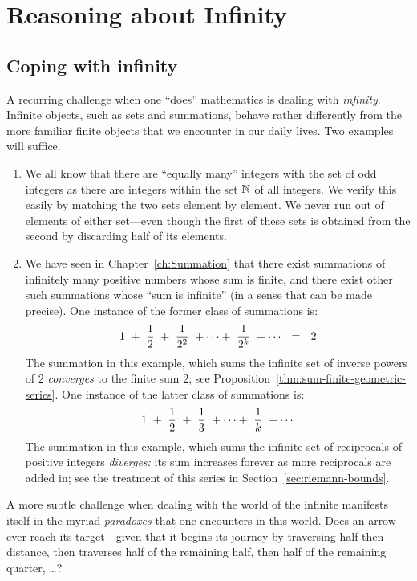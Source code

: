 \section{Reasoning about Infinity}
\label{sec:reasoning-infinity}

\subsection{Coping with infinity}
\label{sec:coping-infinity}

A recurring challenge when one ``does'' mathematics is dealing with
{\em infinity}.  Infinite objects, such as sets and summations, behave
rather differently from the more familiar finite objects that we
encounter in our daily lives.  Two examples will suffice.  
\begin{enumerate}
\item
We all know that there are ``equally many'' integers with the set of
odd integers as there are integers within the set $\mathbb{N}$ of all
integers.  We verify this easily by matching the two sets element by
element.  We never run out of elements of either set---even though the
first of these sets is obtained from the second by discarding half of
its elements.
\item
We have seen in Chapter~\ref{ch:Summation} that there exist summations
of infinitely many positive numbers whose sum is finite, and there
exist other such summations whose ``sum is infinite'' (in a sense that
can be made precise).  One instance of the former class of summations is:
\[ 1 \ + \ {1 \over 2} \ + \ {1 \over 2^2} \ + \cdots + \ {1 \over
  2^k} \ + \cdots \ \ = \ \ 2
\]
The summation in this example, which sums the infinite set of inverse powers
of $2$ {\em converges} to the finite sum $2$; see
Proposition~\ref{thm:sum-finite-geometric-series}.  One instance of
the latter class of summations is:
\[ 1 \ + \ {1 \over 2} \ + \ {1 \over 3} \ + \cdots + \ {1 \over k} \ + \cdots \]
The summation in this example, which sums the infinite set of reciprocals of
positive integers {\em diverges:} its sum increases forever as more
reciprocals are added in; see the treatment of this series in
Section~\ref{sec:riemann-bounds}.
\end{enumerate}

A more subtle challenge when dealing with the world of the infinite
manifests itself in the myriad {\em paradoxes} that one encounters in
this world.  Does an arrow ever reach its target---given that it
begins its journey by traversing half then distance, then traverses
half of the remaining half, then half of the remaining quarter,
\ldots?


